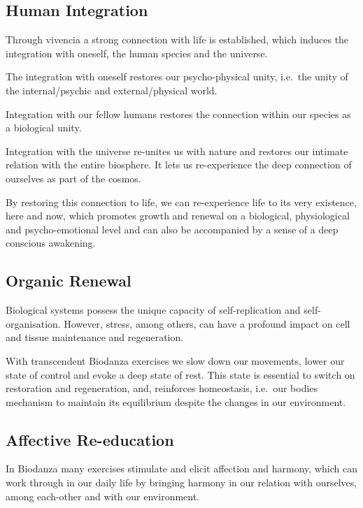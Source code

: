 \documentclass[
  11pt,
]{book}
\begin{document}
\hypertarget{human-integration}{%
\subsection{Human Integration}\label{human-integration}}

Through vivencia a strong connection with life is established, which induces the integration with oneself, the human species and the universe.

The integration with oneself restores our psycho-physical unity, i.e.~the unity of the internal/psychic and external/physical world.

Integration with our fellow humans restores the connection within our species as a biological unity.

Integration with the universe re-unites us with nature and restores our intimate relation with the entire biosphere.
It lets us re-experience the deep connection of ourselves as part of the cosmos.

By restoring this connection to life, we can re-experience life to its very existence, here and now, which promotes growth and renewal on a biological, physiological and psycho-emotional level and can also be accompanied by a sense of a deep conscious awakening.

\hypertarget{organic-renewal}{%
\subsection{Organic Renewal}\label{organic-renewal}}

Biological systems possess the unique capacity of self-replication and self-organisation. However, stress, among others, can have a profound impact on cell and tissue maintenance and regeneration.

With transcendent Biodanza exercises we slow down our movements, lower our state of control and evoke a deep state of rest. This state is essential to switch on restoration and regeneration, and, reinforces homeostasis, i.e.~our bodies mechanism to maintain its equilibrium despite the changes in our environment.

\hypertarget{affective-re-education}{%
\subsection{Affective Re-education}\label{affective-re-education}}

In Biodanza many exercises stimulate and elicit affection and harmony, which can work through in our daily life by bringing harmony in our relation with ourselves, among each-other and with our environment.
\end{document}
